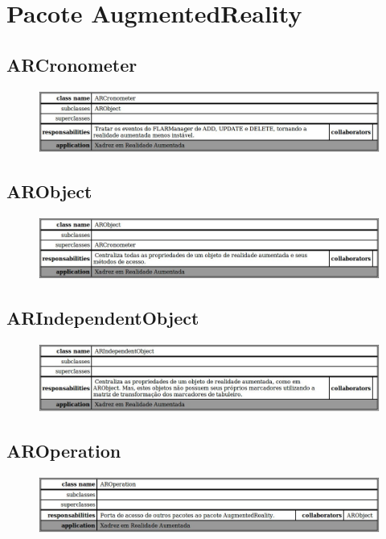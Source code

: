 \documentclass[a4paper,12pt]{book}
\begin{document}
  \section{Pacote AugmentedReality}
  \label{sec:crcpacoteaugmentedreality}
    \subsection{ARCronometer}
    \label{subsec:crcarcronometer}
    \begin{figure}[H]
	  \centering
	  \includegraphics[width=1.0\textwidth]{crc/ARCronometer}
	  \end{figure}
    \subsection{ARObject}
    \label{subsec:crcarobject}
    \begin{figure}[H]
	  \centering
	  \includegraphics[width=1.0\textwidth]{crc/ARObject}
	  \end{figure}
    \subsection{ARIndependentObject}
    \label{subsec:crcarindependentobject}
    \begin{figure}[H]
	  \centering
	  \includegraphics[width=1.0\textwidth]{crc/ARIndependentObject}
	  \end{figure}
    \subsection{AROperation}
    \label{subsec:crcaroperation}
    \begin{figure}[H]
	  \centering
	  \includegraphics[width=1.0\textwidth]{crc/AROperation}
	  \end{figure}
\end{document}
